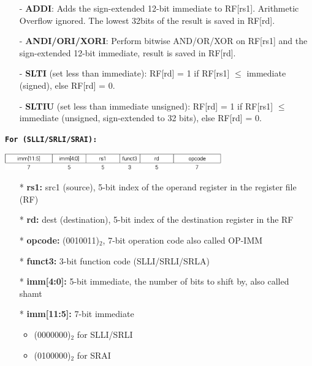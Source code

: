 \documentclass[12pt,openany]{book}
\begin{document}
\begin{itemize}
	\item[-] \textbf{ADDI}: Adds the sign-extended 12-bit immediate to RF[rs1]. Arithmetic Overflow ignored. The lowest 32bits of the result is saved in RF[rd].

	\item[-] \textbf{ANDI/ORI/XORI}: Perform bitwise AND/OR/XOR on RF[rs1] and the sign-extended 12-bit immediate, result is saved in RF[rd].

	\item[-] \textbf{SLTI} (set less than immediate): RF[rd] = 1 if RF[rs1] $\leq$ immediate (signed), else RF[rd] = 0.

	\item[-] \textbf{SLTIU} (set less than immediate unsigned): RF[rd] = 1 if RF[rs1] $\leq$ immediate (unsigned, sign-extended to 32 bits), else RF[rd] = 0.
\end{itemize}


\texttt{\textbf{For (SLLI/SRLI/SRAI):}}\newline
\begin{center}
	\includegraphics[width=0.7\textwidth]{circuits/20.1.2_4.png}
\end{center}
\begin{itemize}
	\item[*] \textbf{rs1:} src1 (source), 5-bit index of the operand register in the register file (RF)
	\item[*] \textbf{rd:} dest (destination), 5-bit index of the destination register in the RF
	\item[*] \textbf{opcode:} (0010011)$_2$, 7-bit operation code also called OP-IMM
	\item[*] \textbf{funct3:} 3-bit function code (SLLI/SRLI/SRLA)
	\item[*] \textbf{imm[4:0]:} 5-bit immediate, the number of bits to shift by, also called shamt
	\item[*] \textbf{imm[11:5]:} 7-bit immediate
	\begin{itemize}
	  \item (0000000)$_2$ for SLLI/SRLI
	  \item (0100000)$_2$ for SRAI
	\end{itemize}
  \end{itemize}
\end{document}
